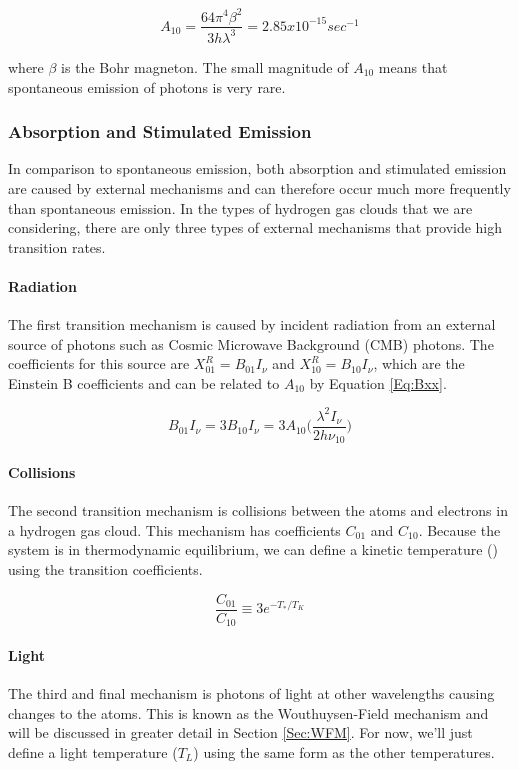 \begin{equation}
A_{10} = \frac{64 \pi^4 \beta^2}{3 h \lambda^3} = 2.85 x 10^{-15} sec^{-1}
\end{equation}

where $\beta$ is the Bohr magneton. The small magnitude of $A_{10}$ means that spontaneous emission of \cm photons is very rare. 

\subsubsection{Absorption and Stimulated Emission}
In comparison to spontaneous emission, both absorption and stimulated emission are caused by external mechanisms and can therefore occur much more frequently than spontaneous emission. In the types of hydrogen gas clouds that we are considering, there are only three types of external mechanisms that provide high transition rates. 

\paragraph{Radiation}
The first transition mechanism is caused by incident radiation from an external source of \cm photons such as Cosmic Microwave Background (CMB) photons. The coefficients for this source are $X^R_{01} = B_{01} I_\nu$ and $X^R_{10} = B_{10} I_\nu $, which are the Einstein B coefficients and can be related to $A_{10}$ by Equation \ref{Eq:Bxx}. 

\begin{equation} \label{Eq:Bxx}
B_{01} I_{\nu} = 3 B_{10} I_{\nu} = 3 A_{10} \Big( \frac{\lambda^2 I_\nu}{ 2 h \nu_{10}} \Big)
\end{equation}

\paragraph{Collisions}
The second transition mechanism is collisions between the atoms and electrons in a hydrogen gas cloud. This mechanism has coefficients $C_{01}$ and $C_{10}$. Because the system is in thermodynamic equilibrium, we can define a kinetic temperature (\tk) using the transition coefficients. 

\begin{equation}
\frac{C_{01}}{C_{10}} \equiv 3 e^{-T_*/T_K}
\end{equation}

\paragraph{Light}
The third and final mechanism is photons of light at other wavelengths causing changes to the atoms. This is known as the Wouthuysen-Field mechanism \cite{wouthuysen_1952}\cite{field_1958} and will be discussed in greater detail in Section \ref{Sec:WFM}. For now, we'll just define a light temperature ($T_L$) using the same form as the other temperatures.

